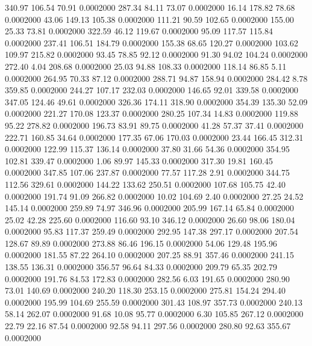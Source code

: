  340.97  106.54   70.91   0.0002000
 287.34   84.11   73.07   0.0002000
  16.14  178.82   78.68   0.0002000
  43.06  149.13  105.38   0.0002000
 111.21   90.59  102.65   0.0002000
 155.00   25.33   73.81   0.0002000
 322.59   46.12  119.67   0.0002000
  95.09  117.57  115.84   0.0002000
 237.41  106.51  184.79   0.0002000
 155.38   68.65  120.27   0.0002000
 103.62  109.97  215.82   0.0002000
  93.45   78.85   92.12   0.0002000
  91.30   94.02  104.24   0.0002000
 272.40    4.04  208.68   0.0002000
  25.03   94.88  108.33   0.0002000
 118.14   86.85    5.11   0.0002000
 264.95   70.33   87.12   0.0002000
 288.71   94.87  158.94   0.0002000
 284.42    8.78  359.85   0.0002000
 244.27  107.17  232.03   0.0002000
 146.65   92.01  339.58   0.0002000
 347.05  124.46   49.61   0.0002000
 326.36  174.11  318.90   0.0002000
 354.39  135.30   52.09   0.0002000
 221.27  170.08  123.37   0.0002000
 280.25  107.34   14.83   0.0002000
 119.88   95.22  278.82   0.0002000
 196.73   83.91   89.75   0.0002000
  41.28   57.37   37.41   0.0002000
 222.71  160.85   34.64   0.0002000
 177.35   67.06  170.03   0.0002000
  23.44  166.45  312.31   0.0002000
 122.99  115.37  136.14   0.0002000
  37.80   31.66   54.36   0.0002000
 354.95  102.81  339.47   0.0002000
   1.06   89.97  145.33   0.0002000
 317.30   19.81  160.45   0.0002000
 347.85  107.06  237.87   0.0002000
  77.57  117.28    2.91   0.0002000
 344.75  112.56  329.61   0.0002000
 144.22  133.62  250.51   0.0002000
 107.68  105.75   42.40   0.0002000
 191.74   91.09  266.82   0.0002000
  10.02  104.69    2.40   0.0002000
  27.25   24.52  145.14   0.0002000
 259.89   74.97  346.96   0.0002000
 205.99  167.14   65.84   0.0002000
  25.02   42.28  225.60   0.0002000
 116.60   93.10  346.12   0.0002000
  26.60   98.06  180.04   0.0002000
  95.83  117.37  259.49   0.0002000
 292.95  147.38  297.17   0.0002000
 207.54  128.67   89.89   0.0002000
 273.88   86.46  196.15   0.0002000
  54.06  129.48  195.96   0.0002000
 181.55   87.22  264.10   0.0002000
 207.25   88.91  357.46   0.0002000
 241.15  138.55  136.31   0.0002000
 356.57   96.64   84.33   0.0002000
 209.79   65.35  202.79   0.0002000
 191.76   84.53  172.83   0.0002000
 282.56    6.03  191.65   0.0002000
 280.90   73.01  140.69   0.0002000
 240.20  118.30  253.15   0.0002000
 275.81  154.24  294.40   0.0002000
 195.99  104.69  255.59   0.0002000
 301.43  108.97  357.73   0.0002000
 240.13   58.14  262.07   0.0002000
  91.68   10.08   95.77   0.0002000
   6.30  105.85  267.12   0.0002000
  22.79   22.16   87.54   0.0002000
  92.58   94.11  297.56   0.0002000
 280.80   92.63  355.67   0.0002000
